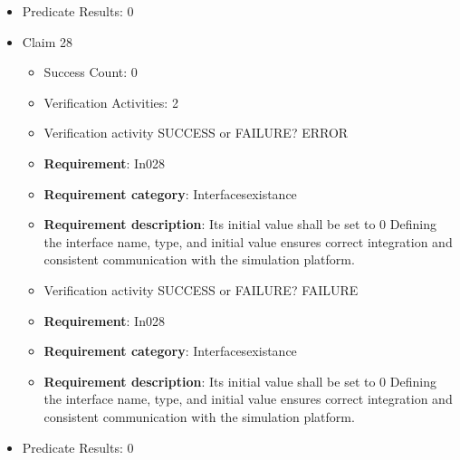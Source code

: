 \documentclass{article}
\begin{document}
\begin{itemize}
\begin{itemize}
					\item Verification activity SUCCESS or FAILURE? FAILURE
		
						\item \textbf{Requirement}: In027 
						\item \textbf{Requirement category}: Interfacesexistance 
						\item \textbf{Requirement description}: Its initial value shall be set to 0 Defining the interface name, type, and initial value ensures correct integration and consistent communication with the simulation platform.
					
				\end{itemize}
				
									    
				\item Predicate Results: 0

  				  \item Claim 28
				\begin{itemize}
			    	\item Success Count: 0 
			    	\item Verification Activities: 2
					\item Verification activity SUCCESS or FAILURE? ERROR
		
						\item \textbf{Requirement}: In028 
						\item \textbf{Requirement category}: Interfacesexistance 
						\item \textbf{Requirement description}: Its initial value shall be set to 0 Defining the interface name, type, and initial value ensures correct integration and consistent communication with the simulation platform.
					
					\item Verification activity SUCCESS or FAILURE? FAILURE
		
						\item \textbf{Requirement}: In028 
						\item \textbf{Requirement category}: Interfacesexistance 
						\item \textbf{Requirement description}: Its initial value shall be set to 0 Defining the interface name, type, and initial value ensures correct integration and consistent communication with the simulation platform.
					
				\end{itemize}
				
									    
				\item Predicate Results: 0


\end{itemize}
\end{document}
